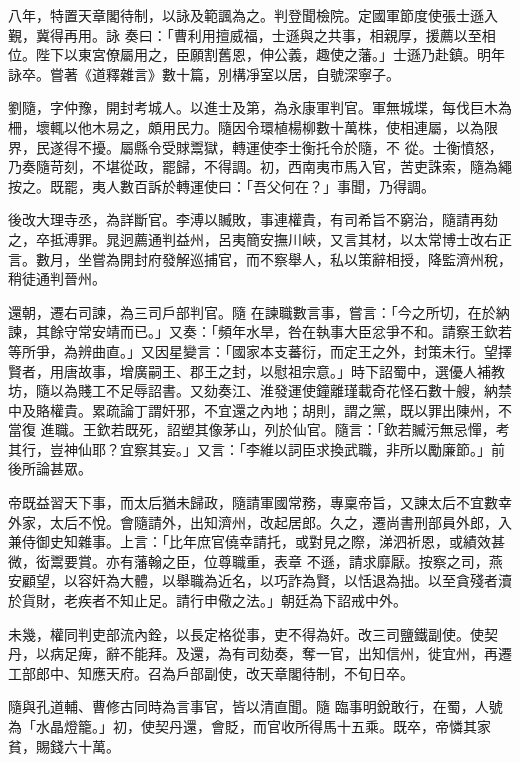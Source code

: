 \begin{pinyinscope}
 八年，特置天章閣待制，以詠及範諷為之。判登聞檢院。定國軍節度使張士遜入覲，冀得再用。詠
 奏曰：「曹利用擅威福，士遜與之共事，相親厚，援薦以至相位。陛下以東宮僚屬用之，臣願割舊恩，伸公義，趣使之藩。」士遜乃赴鎮。明年詠卒。嘗著《道釋雜言》數十篇，別構凈室以居，自號深寧子。



 劉隨，字仲豫，開封考城人。以進士及第，為永康軍判官。軍無城堞，每伐巨木為柵，壞輒以他木易之，頗用民力。隨因令環植楊柳數十萬株，使相連屬，以為限界，民遂得不擾。屬縣令受賕鬻獄，轉運使李士衡托令於隨，不
 從。士衡憤怒，乃奏隨苛刻，不堪從政，罷歸，不得調。初，西南夷市馬入官，苦吏誅索，隨為繩按之。既罷，夷人數百訴於轉運使曰：「吾父何在？」事聞，乃得調。



 後改大理寺丞，為詳斷官。李溥以贓敗，事連權貴，有司希旨不窮治，隨請再劾之，卒抵溥罪。晁迥薦通判益州，呂夷簡安撫川峽，又言其材，以太常博士改右正言。數月，坐嘗為開封府發解巡捕官，而不察舉人，私以策辭相授，降監濟州稅，稍徒通判晉州。



 還朝，遷右司諫，為三司戶部判官。隨
 在諫職數言事，嘗言：「今之所切，在於納諫，其餘守常安靖而已。」又奏：「頻年水旱，咎在執事大臣忿爭不和。請察王欽若等所爭，為辨曲直。」又因星變言：「國家本支蕃衍，而定王之外，封策未行。望擇賢者，用唐故事，增廣嗣王、郡王之封，以慰祖宗意。」時下詔蜀中，選優人補教坊，隨以為賤工不足辱詔書。又劾奏江、淮發運使鐘離瑾載奇花怪石數十艘，納禁中及賂權貴。累疏論丁謂奸邪，不宜還之內地；胡則，謂之黨，既以罪出陳州，不當復
 進職。王欽若既死，詔塑其像茅山，列於仙官。隨言：「欽若贓污無忌憚，考其行，豈神仙耶？宜察其妄。」又言：「李維以詞臣求換武職，非所以勵廉節。」前後所論甚眾。



 帝既益習天下事，而太后猶未歸政，隨請軍國常務，專稟帝旨，又諫太后不宜數幸外家，太后不悅。會隨請外，出知濟州，改起居郎。久之，遷尚書刑部員外郎，入兼侍御史知雜事。上言：「比年庶官僥幸請托，或對見之際，涕泗祈恩，或績效甚微，衒鬻要賞。亦有藩翰之臣，位尊職重，表章
 不遜，請求靡厭。按察之司，燕安顧望，以容奸為大體，以舉職為近名，以巧詐為賢，以恬退為拙。以至貪殘者瀆於貨財，老疾者不知止足。請行申儆之法。」朝廷為下詔戒中外。



 未幾，權同判吏部流內銓，以長定格從事，吏不得為奸。改三司鹽鐵副使。使契丹，以病足痺，辭不能拜。及還，為有司劾奏，奪一官，出知信州，徙宜州，再遷工部郎中、知應天府。召為戶部副使，改天章閣待制，不旬日卒。



 隨與孔道輔、曹修古同時為言事官，皆以清直聞。隨
 臨事明銳敢行，在蜀，人號為「水晶燈籠。」初，使契丹還，會貶，而官收所得馬十五乘。既卒，帝憐其家貧，賜錢六十萬。




\end{pinyinscope}
